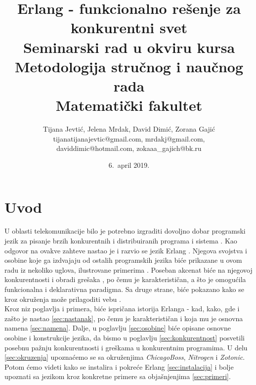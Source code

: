 \documentclass[a4paper]{article}
\begin{document}
\title{Erlang - funkcionalno rešenje za konkurentni svet\\ \small{Seminarski rad u okviru kursa\\Metodologija stručnog i naučnog rada\\ Matematički fakultet}}

\author{Tijana Jevtić, Jelena Mrdak, David Dimić, Zorana Gajić\\
tijanatijanajevtic@gmail.com, mrdakj@gmail.com,\\daviddimic@hotmail.com, zokaaa\_gajich@bk.ru}
\date{6.~april 2019.}
\maketitle



\setcounter{tocdepth}{1} 
\tableofcontents

\newpage

\section{Uvod}
\label{sec:uvod} 
U oblasti telekomunikacije bilo je potrebno izgraditi dovoljno 
dobar programski jezik za pisanje brzih konkurentnih i distribuiranih programa i sistema \cite{book_joe}. 
Kao odgovor na ovakve zahteve nastao je i razvio se jezik Erlang \cite{phdthesis}.
Njegova svojstva i osobine koje ga izdvajaju od ostalih programskih jezika
biće prikazane u ovom radu iz nekoliko uglova, ilustrovane primerima \cite{book_fred, book_joe}.
Poseban akcenat biće na njegovoj konkurentnosti i obradi grešaka \cite{book_concurrent},
po čemu je karakterističan, a što je omogućila funkcionalna i deklarativna paradigma. Sa druge strane, biće pokazano kako se kroz okruženja može prilagoditi vebu \cite{ChicagoBossDocumentation, DjangoTempDoc, ZotonicDocumentation}.\\

Kroz niz poglavlja i primera, biće ispričana istorija Erlanga - kad, kako, gde i zašto je nastao \ref{sec:nastanak}, 
po čemu je karakterističan i koja mu je osnovna namena \ref{sec:namena}. 
Dalje, u poglavlju \ref{sec:osobine} biće opisane osnovne osobine i konstrukcije jezika, da bismo u poglavlju \ref{sec:konkurentnost} posvetili posebnu pažnju konkurentnosti i greškama u konkurentnim programima. 
U delu \ref{sec:okruzenja} upoznaćemo se sa okruženjima {\em ChicagoBoss}, {\em Nitrogen} i { \em Zotonic}. Potom ćemo videti kako se instalira i pokreće Erlang \ref{sec:instalacija}
i bolje upoznati sa jezikom kroz konkretne primere sa objašnjenjima \ref{sec:primeri}.
\end{document}
